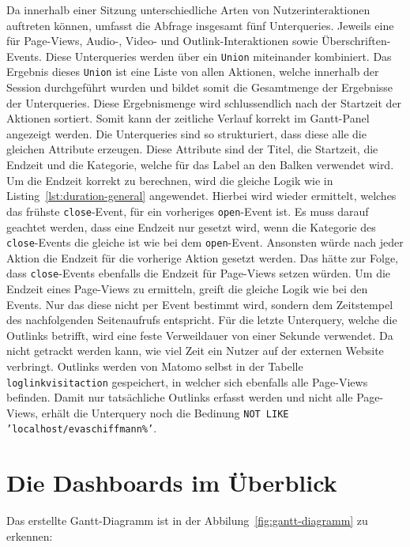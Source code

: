 Da innerhalb einer Sitzung unterschiedliche Arten von Nutzerinteraktionen auftreten können, umfasst die Abfrage insgesamt fünf Unterqueries. Jeweils eine für Page-Views, Audio-, Video- und Outlink-Interaktionen sowie Überschriften-Events. Diese Unterqueries werden über ein \texttt{Union} miteinander kombiniert. Das Ergebnis dieses \texttt{Union} ist eine Liste von allen Aktionen, welche innerhalb der Session durchgeführt wurden und bildet somit die Gesamtmenge der Ergebnisse der Unterqueries. Diese Ergebnismenge wird schlussendlich nach der Startzeit der Aktionen sortiert. Somit kann der zeitliche Verlauf korrekt im Gantt-Panel angezeigt werden. Die Unterqueries sind so strukturiert, dass diese alle die gleichen Attribute erzeugen. Diese Attribute sind der Titel, die Startzeit, die Endzeit und die Kategorie, welche für das Label an den Balken verwendet wird. Um die Endzeit korrekt zu berechnen, wird die gleiche Logik wie in Listing~\ref{lst:duration-general} angewendet. Hierbei wird wieder ermittelt, welches das frühste \texttt{close}-Event, für ein vorheriges \texttt{open}-Event ist. Es muss darauf geachtet werden, dass eine Endzeit nur gesetzt wird, wenn die Kategorie des \texttt{close}-Events die gleiche ist wie bei dem \texttt{open}-Event. Ansonsten würde nach jeder Aktion die Endzeit für die vorherige Aktion gesetzt werden. Das hätte zur Folge, dass \texttt{close}-Events ebenfalls die Endzeit für Page-Views setzen würden. Um die Endzeit eines Page-Views zu ermitteln, greift die gleiche Logik wie bei den Events. Nur das diese nicht per Event bestimmt wird, sondern dem Zeitstempel des nachfolgenden Seitenaufrufs entspricht. Für die letzte Unterquery, welche die Outlinks betrifft, wird eine feste Verweildauer von einer Sekunde verwendet. Da nicht getrackt werden kann, wie viel Zeit ein Nutzer auf der externen Website verbringt. Outlinks werden von Matomo selbst in der Tabelle \texttt{log\textunderscore link\textunderscore visit\textunderscore action} gespeichert, in welcher sich ebenfalls alle Page-Views befinden. Damit nur tatsächliche Outlinks erfasst werden und nicht alle Page-Views, erhält die Unterquery noch die Bedinung \texttt{NOT LIKE 'localhost/evaschiffmann\%'}.

\section{Die Dashboards im Überblick}
Das erstellte Gantt-Diagramm ist in der Abbilung~\ref{fig:gantt-diagramm} zu erkennen:

